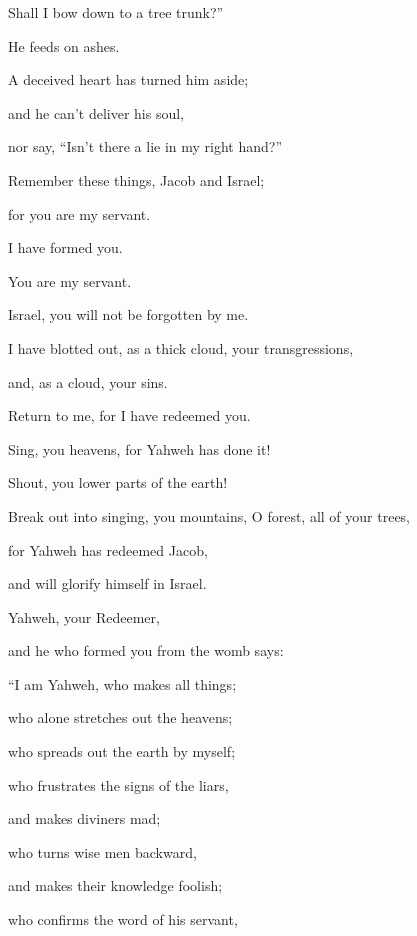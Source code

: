 {\par }{\QB Shall I bow down to a tree trunk?”
\par }{\Q {}He feeds on ashes.
\par }{\QB A deceived heart has turned him aside;
\par }{\QB and he can’t deliver his soul,
\par }{\QB nor say, “Isn’t there a lie in my right hand?”
\par }{\BB \par }{\Q {}Remember these things, Jacob and Israel;
\par }{\QB for you are my servant.
\par }{\QB I have formed you.
\par }{\QB You are my servant.
\par }{\QB Israel, you will not be forgotten by me.
\par }{\Q {}I have blotted out, as a thick cloud, your transgressions,
\par }{\QB and, as a cloud, your sins.
\par }{\QB Return to me, for I have redeemed you.
\par }{\BB \par }{\Q {}Sing, you heavens, for Yahweh has done it!
\par }{\QB Shout, you lower parts of the earth!
\par }{\QB Break out into singing, you mountains, O forest, all of your trees,
\par }{\QB for Yahweh has redeemed Jacob,
\par }{\QB and will glorify himself in Israel.
\par }{\BB \par }{\Q {}Yahweh, your Redeemer,
\par }{\QB and he who formed you from the womb says:
\par }{\Q “I am Yahweh, who makes all things;
\par }{\QB who alone stretches out the heavens;
\par }{\QB who spreads out the earth by myself;
\par }{\Q {}who frustrates the signs of the liars,
\par }{\QB and makes diviners mad;
\par }{\Q who turns wise men backward,
\par }{\QB and makes their knowledge foolish;
\par }{\Q {}who confirms the word of his servant,
}
